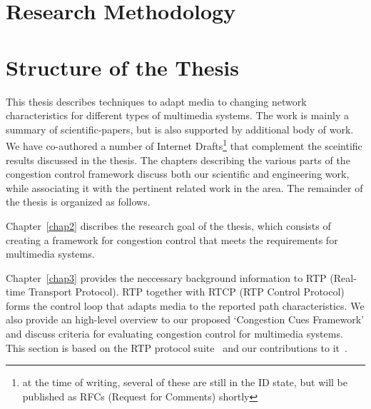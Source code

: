 

\section{Research Methodology}

\section{Structure of the Thesis}

This thesis describes techniques to adapt media to changing network
characteristics for different types of multimedia systems. The work is mainly
a summary of scientific-papers, but is also supported by additional body of
work. We have co-authored a number of Internet Drafts\footnote{at the time of
writing, several of these are still in the ID state, but will be published as
RFCs (Request for Comments) shortly} that complement the  sceintific results
discussed in the thesis. The chapters describing the various parts of the
congestion control framework discuss both our scientific and engineering work,
while associating it with the pertinent related work in the area. The
remainder of the thesis is organized as follows.

Chapter~\ref{chap2} discribes the research goal of the thesis, which consists
of creating a framework for congestion control that meets the requirements for
multimedia systems.


Chapter~\ref{chap3} provides the neccessary background information to RTP
(Real-time Transport Protocol). RTP together with RTCP (RTP Control Protocol)
forms the control loop that adapts media to the reported path characteristics.
We also provide an high-level overview to our proposed `Congestion Cues
Framework' and discuss criteria for evaluating congestion control for
multimedia systems. This section is based on the RTP protocol
suite~\cite{rfc3550, rfc4585, rfc3611, rfc5104, rfc5506} and our contributions
to it~\cite{draft.rmcat.evaluate, draft.xr.discard.rle, draft.xr.jb}.


